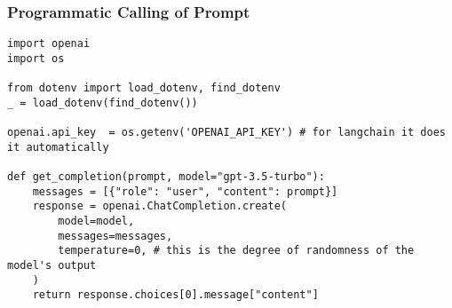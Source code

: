 \begin{frame}[fragile]\frametitle{Programmatic Calling of Prompt}

\begin{lstlisting}
import openai
import os

from dotenv import load_dotenv, find_dotenv
_ = load_dotenv(find_dotenv())

openai.api_key  = os.getenv('OPENAI_API_KEY') # for langchain it does it automatically

def get_completion(prompt, model="gpt-3.5-turbo"):
    messages = [{"role": "user", "content": prompt}]
    response = openai.ChatCompletion.create(
        model=model,
        messages=messages,
        temperature=0, # this is the degree of randomness of the model's output
    )
    return response.choices[0].message["content"]
\end{lstlisting}
		
\end{frame}


